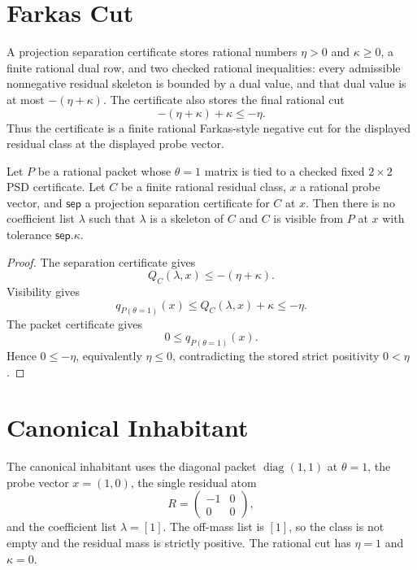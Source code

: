 \section{Farkas Cut}
\label{sec:rh-weil-residual-farkas-cut}

\begin{definition}
\label{def:rh-weil-residual-projection-separation}
A projection separation certificate stores rational numbers $\eta>0$ and
$\kappa\ge0$, a finite rational dual row, and two checked rational inequalities:
every admissible nonnegative residual skeleton is bounded by a dual value, and
that dual value is at most $-(\eta+\kappa)$. The certificate also stores the
final rational cut
$$
-(\eta+\kappa)+\kappa\le -\eta .
$$
Thus the certificate is a finite rational Farkas-style negative cut for the
displayed residual class at the displayed probe vector.
\end{definition}

\begin{theorem}
\label{thm:rh-weil-residual-farkas-cut-exclusion}
Let $P$ be a rational packet whose $\theta=1$ matrix is tied to a checked
fixed $2\times2$ PSD certificate. Let $C$ be a finite rational residual class,
$x$ a rational probe vector, and $\mathsf{sep}$ a projection separation
certificate for $C$ at $x$. Then there is no coefficient list $\lambda$ such
that $\lambda$ is a skeleton of $C$ and $C$ is visible from $P$ at $x$ with
tolerance $\mathsf{sep}.\kappa$.
\end{theorem}

\begin{proof}
The separation certificate gives
$$
Q_C(\lambda,x)\le -(\eta+\kappa).
$$
Visibility gives
$$
q_{P(\theta=1)}(x)\le Q_C(\lambda,x)+\kappa\le -\eta .
$$
The packet certificate gives
$$
0\le q_{P(\theta=1)}(x).
$$
Hence $0\le -\eta$, equivalently $\eta\le0$, contradicting the stored
strict positivity $0<\eta$.
\end{proof}

\section{Canonical Inhabitant}
\label{sec:rh-weil-residual-canonical}

\begin{definition}
\label{def:rh-weil-residual-canonical-cut}
The canonical inhabitant uses the diagonal packet
$\operatorname{diag}(1,1)$ at $\theta=1$, the probe vector $x=(1,0)$, the
single residual atom
$$
R=
\begin{pmatrix}
-1&0\\
0&0
\end{pmatrix},
$$
and the coefficient list $\lambda=[1]$. The off-mass list is $[1]$, so the
class is not empty and the residual mass is strictly positive. The rational
cut has $\eta=1$ and $\kappa=0$.
\end{definition}

